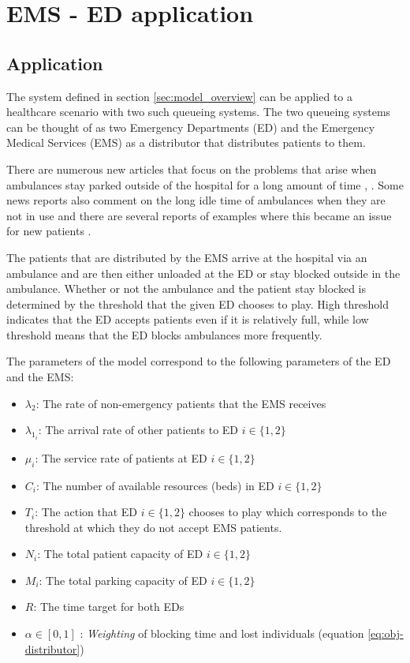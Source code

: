 \section{EMS - ED application}

\subsection{Application}

The system defined in section \ref{sec:model_overview} can be applied 
to a healthcare scenario with two such queueing systems.
The two queueing systems can be thought of as two Emergency Departments (ED) and 
the Emergency Medical Services (EMS) as a distributor that distributes 
patients to them.

There are numerous new articles that focus on the problems that arise when 
ambulances stay parked outside of the hospital for a long amount of time
\cite{dailyrecords}, \cite{staffordshirelive}.
Some news reports also comment on the long idle time of ambulances when 
they are not in use \cite{herefordtimes} and there are several reports of 
examples where this became an issue for new patients \cite{southwalesargus}.

The patients that are distributed by the EMS arrive at the hospital via an 
ambulance and are then either unloaded at the ED or stay blocked outside in 
the ambulance.
Whether or not the ambulance and the patient stay blocked is determined by 
the threshold that the given ED chooses to play.
High threshold indicates that the ED accepts patients even if it is relatively 
full, while low threshold means that the ED blocks ambulances more frequently.

The parameters of the model correspond to the following parameters of the ED and 
the EMS:

\begin{itemize}
    \item \( \lambda_2 \): The rate of non-emergency patients that the EMS 
    receives
    \item \( \lambda_{1_i} \): The arrival rate of other patients to ED \(i\in\{1, 2\}\)
    \item \( \mu_i \): The service rate of patients at ED \(i\in\{1, 2\}\)
    \item \( C_i \): The number of available resources (beds) in ED \(i\in\{1, 2\}\)  
    \item \( T_i \): The action that ED \(i\in\{1, 2\} \) chooses to play which 
    corresponds to the threshold at which they do not accept EMS patients.
    \item \( N_i \): The total patient capacity of ED \(i\in\{1, 2\} \)
    \item \( M_i \): The total parking capacity of ED \(i\in\{1, 2\} \)
    \item \( R \): The time target for both EDs
    \item \( \alpha \in [0, 1] \) : \textit{Weighting} of blocking time and 
    lost individuals (equation \ref{eq:obj-distributor})
\end{itemize}

